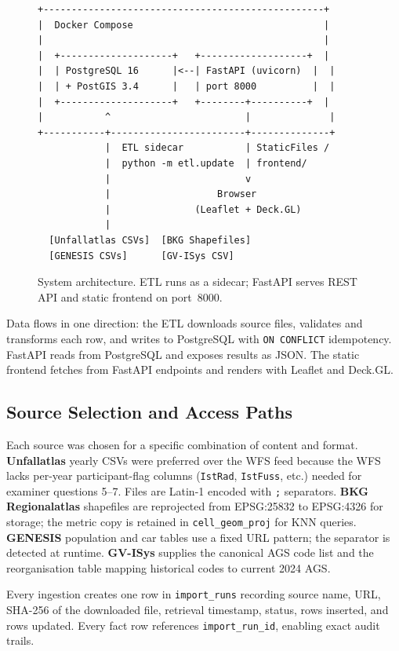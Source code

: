 \documentclass[12pt,a4paper]{article}
\begin{document}
\begin{figure}[H]
\centering
\begin{lstlisting}[numbers=none]
+--------------------------------------------------+
|  Docker Compose                                  |
|                                                  |
|  +--------------------+   +-------------------+  |
|  | PostgreSQL 16      |<--| FastAPI (uvicorn)  |  |
|  | + PostGIS 3.4      |   | port 8000          |  |
|  +--------------------+   +--------+----------+  |
|           ^                        |              |
+-----------+------------------------+--------------+
            |  ETL sidecar           | StaticFiles /
            |  python -m etl.update  | frontend/
            |                        v
            |                   Browser
            |               (Leaflet + Deck.GL)
            |
  [Unfallatlas CSVs]  [BKG Shapefiles]
  [GENESIS CSVs]      [GV-ISys CSV]
\end{lstlisting}
\caption{System architecture. ETL runs as a sidecar; FastAPI serves REST API and static frontend on port~8000.}
\label{fig:arch}
\end{figure}

Data flows in one direction: the ETL downloads source files, validates and transforms each row, and writes to PostgreSQL with \texttt{ON CONFLICT} idempotency. FastAPI reads from PostgreSQL and exposes results as JSON. The static frontend fetches from FastAPI endpoints and renders with Leaflet and Deck.GL.

\subsection{Source Selection and Access Paths}

Each source was chosen for a specific combination of content and format. \textbf{Unfallatlas} yearly CSVs were preferred over the WFS feed because the WFS lacks per-year participant-flag columns (\texttt{IstRad}, \texttt{IstFuss}, etc.) needed for examiner questions 5--7. Files are Latin-1 encoded with \texttt{;} separators. \textbf{BKG Regionalatlas} shapefiles are reprojected from EPSG:25832 to EPSG:4326 for storage; the metric copy is retained in \texttt{cell\_geom\_proj} for KNN queries. \textbf{GENESIS} population and car tables use a fixed URL pattern; the separator is detected at runtime. \textbf{GV-ISys} supplies the canonical AGS code list and the reorganisation table mapping historical codes to current 2024 AGS.

Every ingestion creates one row in \texttt{import\_runs} recording source name, URL, SHA-256 of the downloaded file, retrieval timestamp, status, rows inserted, and rows updated. Every fact row references \texttt{import\_run\_id}, enabling exact audit trails.
\end{document}
